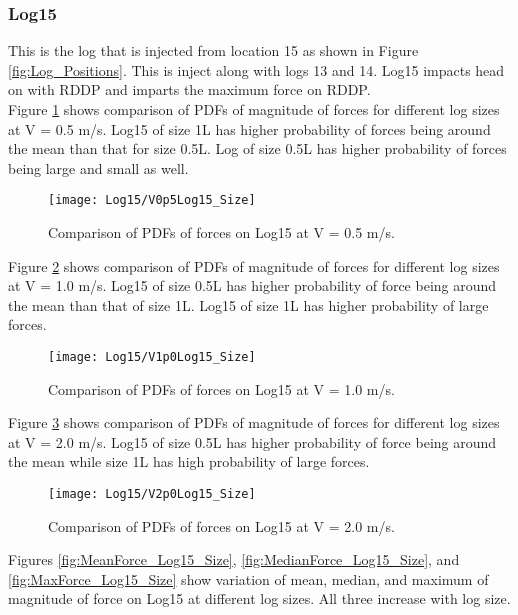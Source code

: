 \FloatBarrier
\subsubsection{Log15}
This is the log that is injected from location 15 as shown in Figure \ref{fig:Log_Positions}. This is inject along with logs 13 and 14. Log15 impacts head on with RDDP and imparts the maximum force on RDDP.\\ 
Figure \ref{fig:V0p5Log15_Size} shows comparison of PDFs of magnitude of forces for different log sizes at V = 0.5 m/s. Log15 of size 1L has higher probability of forces being around the mean than that for size 0.5L. Log of size 0.5L has higher probability of forces being large and small as well.

\begin{figure}
\centering
\texttt{[image: Log15/V0p5Log15\_Size]}
\caption{\label{fig:V0p5Log15_Size}Comparison of PDFs of forces on Log15 at V = 0.5 m/s.}
\end{figure}

\noindent Figure \ref{fig:V1p0Log15_Size} shows comparison of PDFs of magnitude of forces for different log sizes at V = 1.0 m/s. Log15 of size 0.5L has higher probability of force being around the mean than that of size 1L. Log15 of size 1L has higher probability of large forces.

\begin{figure}
\centering
\texttt{[image: Log15/V1p0Log15\_Size]}
\caption{\label{fig:V1p0Log15_Size}Comparison of PDFs of forces on Log15 at V = 1.0 m/s.}
\end{figure}

\noindent Figure \ref{fig:V2p0Log15_Size} shows comparison of PDFs of magnitude of forces for different log sizes at V = 2.0 m/s. Log15 of size 0.5L has higher probability of force being around the mean while size 1L has high probability of large forces.  

\begin{figure}
\centering
\texttt{[image: Log15/V2p0Log15\_Size]}
\caption{\label{fig:V2p0Log15_Size}Comparison of PDFs of forces on Log15 at V = 2.0 m/s.}
\end{figure}

\noindent Figures \ref{fig:MeanForce_Log15_Size}, \ref{fig:MedianForce_Log15_Size}, and \ref{fig:MaxForce_Log15_Size} show variation of mean, median, and maximum of magnitude of force on Log15 at different log sizes. All three increase with log size.

